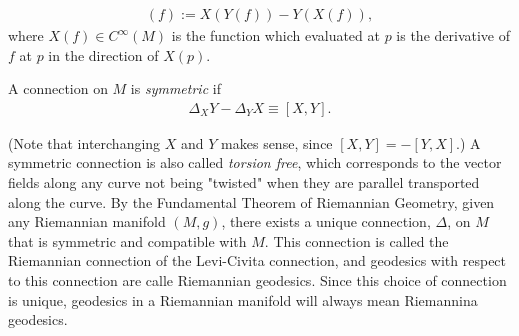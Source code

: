 \begin{align*}
[X , Y] (f) := X(Y(f)) - Y(X(f)),
\end{align*}
where $X(f) \in C^\infty (M)$ is the function which evaluated at $p$ is the derivative of $f$ at $p$ in the direction of $X(p)$. 

\begin{definition}
A connection on $M$ is \textit{symmetric} if 
\begin{align*}
\Delta_X Y - \Delta_Y X \equiv [X, Y].
\end{align*}
\end{definition}

(Note that interchanging $X$ and $Y$ makes sense, since $[X, Y] = - [Y, X]$.) A symmetric connection is also called \textit{torsion free}, which corresponds to the vector fields along any curve not being "twisted" when they are parallel transported along the curve. By the Fundamental Theorem of Riemannian Geometry, given any Riemannian manifold $(M,g)$, there exists a unique connection, $\Delta$, on $M$ that is symmetric and compatible with $M$. This connection is called the Riemannian connection of the Levi-Civita connection, and geodesics with respect to this connection are calle Riemannian geodesics. Since this choice of connection is unique, geodesics in a Riemannian manifold will always mean Riemannina geodesics.   







\newpage
\thispagestyle{empty}
\cleartooddpage